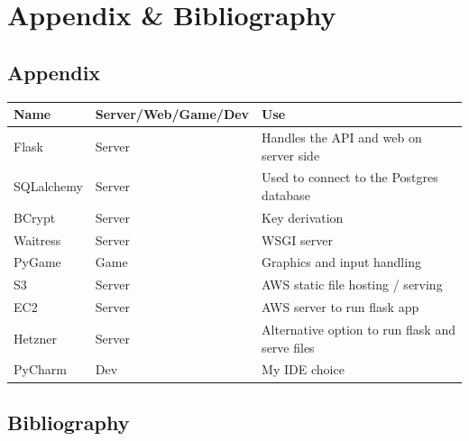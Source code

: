 \documentclass[a4paper, 11pt]{report}
\begin{document}
\chapter{Appendix \& Bibliography}
\section{Appendix}
\begin{table}[!ht]
\begin{tabular}{|l|l|l|}
\hline
\rowcolor[HTML]{C0C0C0} 
{\color[HTML]{000000} \textbf{Name}} & {\color[HTML]{000000} \textbf{Server/Web/Game/Dev}} & {\color[HTML]{000000} \textbf{Use}}             \\ \hline
Flask                                & Server                                              & Handles the API and web on server side          \\ \hline
SQLalchemy                           & Server                                              & Used to connect to the Postgres database        \\ \hline
BCrypt                               & Server                                              & Key derivation                                  \\ \hline
Waitress                             & Server                                              & WSGI server                                     \\ \hline
PyGame                               & Game                                                & Graphics and input handling                     \\ \hline
S3                                   & Server                                              & AWS static file hosting / serving               \\ \hline
EC2                                  & Server                                              & AWS server to run flask app                     \\ \hline
Hetzner                              & Server                                              & Alternative option to run flask and serve files \\ \hline
PyCharm                              & Dev                                                 & My IDE choice                                   \\ \hline
\end{tabular}
\section{Bibliography}




\end{table}
\end{document}
